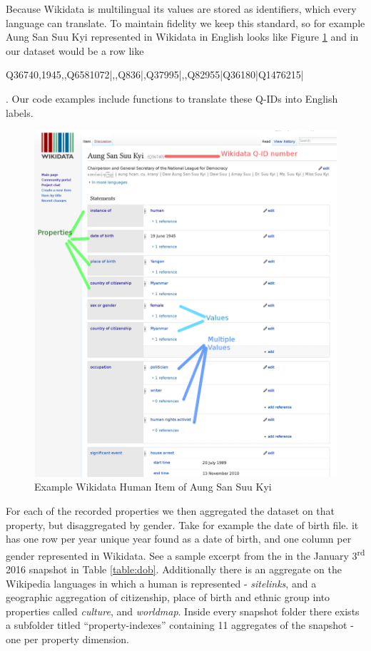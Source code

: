 \documentclass[letterpaper]{article}
\begin{document}
Because Wikidata is multilingual its values are stored as identifiers, which every language can translate. To maintain fidelity we keep this standard, so for example Aung San Suu Kyi represented in Wikidata in English looks like Figure \ref{fig:aung} and in our dataset would be a row like \begin{small} Q36740,1945,,Q6581072|,,Q836|,Q37995|,,Q82955|Q36180|Q1476215|
\end{small}. Our code examples include functions to translate these Q-IDs into English labels.

\begin{figure}
\includegraphics[scale=0.15]{figures/aung_explainer.png} 
\caption{Example Wikidata Human Item of Aung San Suu Kyi}
\label{fig:aung}
\end{figure}
 
For each of the recorded properties we then aggregated the dataset on that property, but disaggregated by gender. Take for example the date of birth file. it has one row per year unique year found as a date of birth, and one column per gender represented in Wikidata. See a sample excerpt from the in the January 3\textsuperscript{rd} 2016 snapshot in Table \ref{table:dob}. Additionally there is an aggregate on the Wikipedia languages in which a human is represented - \textit{sitelinks}, and a geographic aggregation of citizenship, place of birth and ethnic group into properties called \textit{culture}, and \textit{worldmap}. Inside every snapshot folder there exists a subfolder titled ``property-indexes'' containing 11 aggregates of the snapshot - one per property dimension.
 
\end{document}
